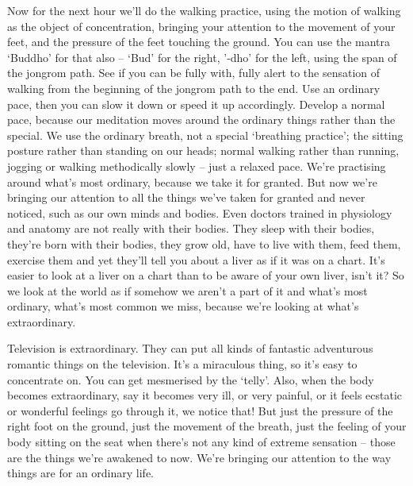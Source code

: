 
Now for the next hour we'll do the walking practice, using the motion of walking as the object of concentration, bringing your attention to the movement of your feet, and the pressure of the feet touching the ground. You can use the mantra `Buddho' for that also -- `Bud' for the right, '-dho' for the left, using the span of the jongrom path. See if you can be fully with, fully alert to the sensation of walking from the beginning of the jongrom path to the end. Use an ordinary pace, then you can slow it down or speed it up accordingly. Develop a normal pace, because our meditation moves around the ordinary things rather than the special. We use the ordinary breath, not a special `breathing practice'; the sitting posture rather than standing on our heads; normal walking rather than running, jogging or walking methodically slowly -- just a relaxed pace. We're practising around what's most ordinary, because we take it for granted. But now we're bringing our attention to all the things we've taken for granted and never noticed, such as our own minds and bodies. Even doctors trained in physiology and anatomy are not really with their bodies. They sleep with their bodies, they're born with their bodies, they grow old, have to live with them, feed them, exercise them and yet they'll tell you about a liver as if it was on a chart. It's easier to look at a liver on a chart than to be aware of your own liver, isn't it? So we look at the world as if somehow we aren't a part of it and what's most ordinary, what's most common we miss, because we're looking at what's extraordinary.

Television is extraordinary. They can put all kinds of fantastic adventurous romantic things on the television. It's a miraculous thing, so it's easy to concentrate on. You can get mesmerised by the `telly'. Also, when the body becomes extraordinary, say it becomes very ill, or very painful, or it feels ecstatic or wonderful feelings go through it, we notice that! But just the pressure of the right foot on the ground, just the movement of the breath, just the feeling of your body sitting on the seat when there's not any kind of extreme sensation -- those are the things we're awakened to now. We're bringing our attention to the way things are for an ordinary life.

